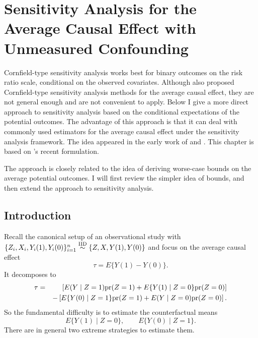 
\chapter{Sensitivity Analysis for the Average Causal Effect with Unmeasured Confounding}
\label{chapter::sensitivity-ACE}


 
 
 
 
Cornfield-type sensitivity analysis works best for binary outcomes on the risk ratio scale, conditional on the observed covariates. Although  \citet{ding2016sensitivity} also proposed Cornfield-type sensitivity analysis methods for the average causal effect, they are not general enough and are not convenient to apply. Below I give a more direct approach to sensitivity analysis based on the conditional expectations of the potential outcomes. The advantage of this approach is that it can deal with commonly used estimators for the average causal effect under the sensitivity analysis framework. 
The idea appeared in the early work of \citet{robins1999association} and \citet{scharfstein1999adjusting}. This chapter is based on \citet{luding2023flexible}'s recent formulation.  
 
 
 
 
 The approach is closely related to the idea of deriving worse-case bounds on the average potential outcomes. I will first review the simpler idea of bounds, and then extend the approach to sensitivity analysis. 



\section{Introduction}


Recall the canonical setup of an observational study with  $\{  Z_i, X_i,  Y_i(1), Y_i(0) \}_{i=1}^n \stackrel{\textup{IID}}{\sim}  \{ Z, X, Y(1), Y(0) \}$ and focus on the average causal effect
$$
\tau = E\{ Y(1) - Y(0) \}.
$$
It decomposes to
\begin{eqnarray*}
\tau &=& \left[  E(Y\mid Z=1) \textup{pr}(Z=1) + E\{ Y(1)\mid Z=0 \} \textup{pr}(Z=0) \right]  \\
&&- \left[   E\{ Y(0)\mid Z=1\} \textup{pr}(Z=1) + E(Y\mid Z=0)  \textup{pr}(Z=0)  \right] . 
\end{eqnarray*}
So the fundamental difficulty is to estimate the counterfactual means 
$$
E\{ Y(1)\mid Z=0 \}  ,\quad \quad E\{ Y(0)\mid Z=1\}.
$$
There are in general two extreme strategies to estimate them.



